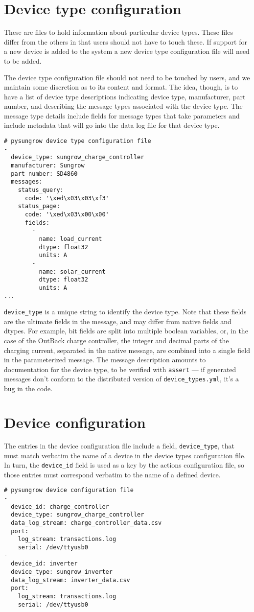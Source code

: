 \documentclass[pdftex,oneside,12pt,a4paper]{book}
\begin{document}
\section{Device type configuration}
These are files to hold information about particular device types.  These files differ from the others in that users should not have to touch these.  If support for a new device is added to the system a new device type configuration file will need to be added.

The device type configuration file should not need to be touched by users, and we maintain some discretion as to its content and format.  The idea, though, is to have a list of device type descriptions indicating device type, manufacturer, part number, and describing the message types associated with the device type.  The message type details include fields for message types that take parameters and include metadata that will go into the data log file for that device type.
\begin{verbatim}
# pysungrow device type configuration file
-
  device_type: sungrow_charge_controller
  manufacturer: Sungrow
  part_number: SD4860
  messages:
    status_query:
      code: '\xed\x03\x03\xf3'
    status_page:
      code: '\xed\x03\x00\x00'
      fields:
        -
          name: load_current
          dtype: float32
          units: A
        -
          name: solar_current
          dtype: float32
          units: A
...
\end{verbatim}
\verb|device_type| is a unique string to identify the device type.  Note that these fields are the ultimate fields in the message, and may differ from native fields and dtypes.  For example, bit fields are split into multiple boolean variables, or, in the case of the OutBack charge controller, the integer and decimal parts of the charging current, separated in the native message, are combined into a single field in the parameterized message.  The message description amounts to documentation for the device type, to be verified with \verb|assert| --- if generated messages don't conform to the distributed version of \verb|device_types.yml|, it's a bug in the code.

\section{Device configuration}
The entries in the device configuration file include a field, \verb|device_type|, that must match verbatim the name of a device in the device types configuration file.  In turn, the \verb|device_id| field is used as a key by the actions configuration file, so those entries must correspond verbatim to the name of a defined device.
\begin{verbatim}
# pysungrow device configuration file
-
  device_id: charge_controller
  device_type: sungrow_charge_controller
  data_log_stream: charge_controller_data.csv
  port:
    log_stream: transactions.log
    serial: /dev/ttyusb0
-
  device_id: inverter
  device_type: sungrow_inverter
  data_log_stream: inverter_data.csv
  port:
    log_stream: transactions.log
    serial: /dev/ttyusb0
\end{verbatim}
\end{document}
